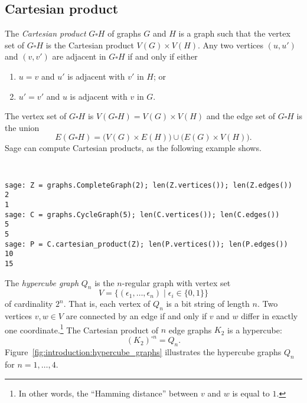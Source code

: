 
\subsection{Cartesian product}

\index{$\square$}
The \emph{Cartesian product} $G \square H$ of graphs $G$ and $H$ is a
graph such that the vertex set of $G \square H$ is the Cartesian
product $V(G) \times V(H)$. Any two vertices $(u, u')$ and $(v, v')$
are adjacent in $G \square H$ if and only if either
%
\begin{enumerate}
\item $u = v$ and $u'$ is adjacent with $v'$ in $H$; or

\item $u' = v'$ and $u$ is adjacent with $v$ in $G$.
\end{enumerate}
The vertex set of $G \square H$ is $V(G \square H) = V(G) \times V(H)$
and the edge set of $G \square H$ is the union
\[
E(G \square H)
=
\big(V(G) \times E(H)\big) \cup \big(E(G) \times V(H)\big).
\]
%
Sage can compute Cartesian products, as the following example shows.
%
\begin{center}
\fontsize{9pt}{9pt}
\selectfont
\tt
\begin{lstlisting}
sage: Z = graphs.CompleteGraph(2); len(Z.vertices()); len(Z.edges())
2
1
sage: C = graphs.CycleGraph(5); len(C.vertices()); len(C.edges())
5
5
sage: P = C.cartesian_product(Z); len(P.vertices()); len(P.edges())
10
15
\end{lstlisting}
\end{center}

The \emph{hypercube graph} $Q_n$ is the $n$-regular graph with vertex
set
\[
V
=
\big\{ (\epsilon_1,\dots,\epsilon_n) \;|\; \epsilon_i \in \{0,1\} \big\}
\]
of cardinality $2^n$. That is, each vertex of $Q_n$ is a bit string of
length $n$. Two vertices $v,w \in V$ are connected by an edge if and
only if $v$ and $w$ differ in exactly one coordinate.\footnote{
In other words, the ``Hamming distance'' between $v$ and $w$ is equal
to $1$.}
The Cartesian product of $n$ edge graphs $K_2$ is a hypercube:
\[
(K_2)^{\square n} = Q_n.
\]
Figure~\ref{fig:introduction:hypercube_graphs} illustrates the
hypercube graphs $Q_n$ for $n = 1,\dots,4$.

